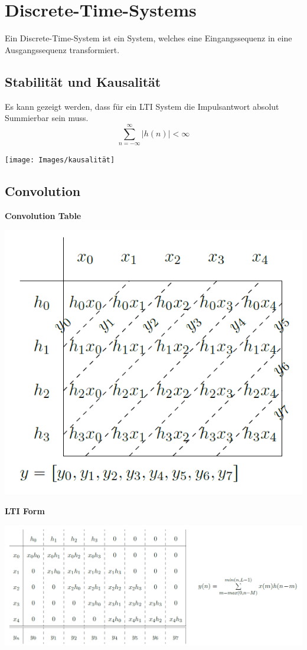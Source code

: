 \section{Discrete-Time-Systems}
Ein Discrete-Time-System ist ein System, welches eine Eingangssequenz in eine Ausgangssequenz transformiert.

\subsection{Stabilität und Kausalität}
Es kann gezeigt werden, dass für ein LTI System die Impulsantwort absolut Summierbar sein muss.
\[
\sum_{n=-\infty}^{\infty}\left|h(n)\right| \lt \infty
\]

\begin{center}
	\texttt{[image: Images/kausalität]}
\end{center}



\subsection{Convolution}
\textbf{Convolution Table}
\begin{center}
	\includegraphics[width=0.7\columnwidth]{Images/convtable}
\end{center}


\textbf{LTI Form}
\begin{center}
	\includegraphics[width=\columnwidth]{Images/lti}
\end{center}

